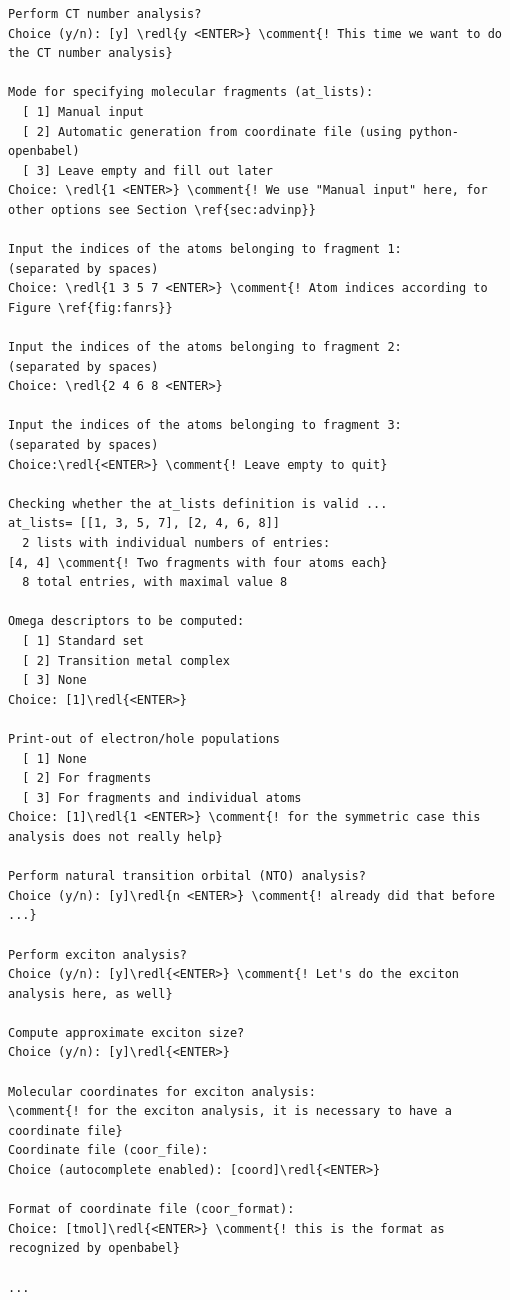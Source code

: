 \documentclass[DIV=12,headings=normal]{scrartcl}
\newcommand\Cline[2][red]{{\sbox\MBox{#2}%
  \rlap{\usebox\MBox}\color{#1}\rule[-1.2\dp\MBox]{\wd\MBox}{0.5pt}}}
\newcommand{\comment}[1]{\textcolor{blue}{#1}}
\newcommand{\redl}[1]{\Cline{\textcolor{red}{#1}}}
\newcounter{number}
\begin{document}
\scriptsize
\begin{Verbatim}[commandchars=\\\{\}]
Perform CT number analysis?
Choice (y/n): [y] \redl{y <ENTER>} \comment{! This time we want to do the CT number analysis}

Mode for specifying molecular fragments (at_lists):
  [ 1] Manual input
  [ 2] Automatic generation from coordinate file (using python-openbabel)
  [ 3] Leave empty and fill out later
Choice: \redl{1 <ENTER>} \comment{! We use "Manual input" here, for other options see Section \ref{sec:advinp}}

Input the indices of the atoms belonging to fragment 1:
(separated by spaces)
Choice: \redl{1 3 5 7 <ENTER>} \comment{! Atom indices according to Figure \ref{fig:fanrs}}

Input the indices of the atoms belonging to fragment 2:
(separated by spaces)
Choice: \redl{2 4 6 8 <ENTER>}

Input the indices of the atoms belonging to fragment 3:
(separated by spaces)
Choice:\redl{<ENTER>} \comment{! Leave empty to quit}

Checking whether the at_lists definition is valid ...
at_lists= [[1, 3, 5, 7], [2, 4, 6, 8]]
  2 lists with individual numbers of entries:
[4, 4] \comment{! Two fragments with four atoms each}
  8 total entries, with maximal value 8

Omega descriptors to be computed:
  [ 1] Standard set
  [ 2] Transition metal complex
  [ 3] None
Choice: [1]\redl{<ENTER>}

Print-out of electron/hole populations
  [ 1] None
  [ 2] For fragments
  [ 3] For fragments and individual atoms
Choice: [1]\redl{1 <ENTER>} \comment{! for the symmetric case this analysis does not really help}

Perform natural transition orbital (NTO) analysis?
Choice (y/n): [y]\redl{n <ENTER>} \comment{! already did that before ...}

Perform exciton analysis?
Choice (y/n): [y]\redl{<ENTER>} \comment{! Let's do the exciton analysis here, as well}

Compute approximate exciton size?
Choice (y/n): [y]\redl{<ENTER>}

Molecular coordinates for exciton analysis:
\comment{! for the exciton analysis, it is necessary to have a coordinate file}
Coordinate file (coor_file):
Choice (autocomplete enabled): [coord]\redl{<ENTER>}

Format of coordinate file (coor_format):
Choice: [tmol]\redl{<ENTER>} \comment{! this is the format as recognized by openbabel}

...
\end{Verbatim}
\normalsize
\end{document}

